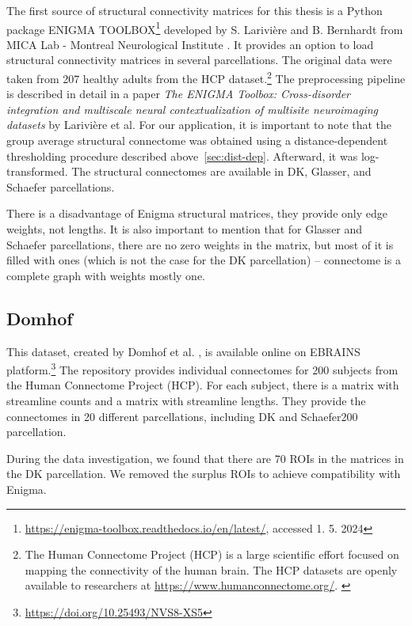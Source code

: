 The first source of structural connectivity matrices for this thesis is a Python package ENIGMA TOOLBOX\footnote{\url{https://enigma-toolbox.readthedocs.io/en/latest/}, accessed 1. 5. 2024} developed by S. Larivière and B. Bernhardt from MICA Lab - Montreal Neurological Institute \cite{lariviere_enigma_2020}. It provides an option to load structural connectivity matrices in several parcellations. The original data were taken from 207 healthy adults from the HCP dataset.\footnote{The Human Connectome Project (HCP) is a large scientific effort focused on mapping the connectivity of the human brain. The HCP datasets are openly available to researchers at \url{https://www.humanconnectome.org/}. \cite{van_essen_human_2012}} The preprocessing pipeline is described in detail in a paper \textit{The ENIGMA Toolbox: Cross-disorder integration and multiscale neural contextualization of multisite neuroimaging datasets} by Larivière et al. For our application, it is important to note that the group average structural connectome was obtained using a distance-dependent thresholding procedure described above~\ref{sec:dist-dep}. Afterward, it was log-transformed. The structural connectomes are available in DK, Glasser, and Schaefer parcellations. 

There is a disadvantage of Enigma structural matrices, they provide only edge weights, not lengths. It is also important to mention that for Glasser and Schaefer parcellations, there are no zero weights in the matrix, but most of it is filled with ones (which is not the case for the DK parcellation) -- connectome is a complete graph with weights mostly one.

\subsection{Domhof}

This dataset, created by Domhof et al. \cite{domhof_parcellation-based_2022}, is available online on EBRAINS platform.\footnote{\url{https://doi.org/10.25493/NVS8-XS5}} The repository provides individual connectomes for 200 subjects from the Human Connectome Project (HCP). For each subject, there is a matrix with streamline counts and a matrix with streamline lengths. They provide the connectomes in 20 different parcellations, including DK and Schaefer200 parcellation. 

During the data investigation, we found that there are 70 ROIs in the matrices in the DK parcellation. We removed the surplus ROIs to achieve compatibility with Enigma.

